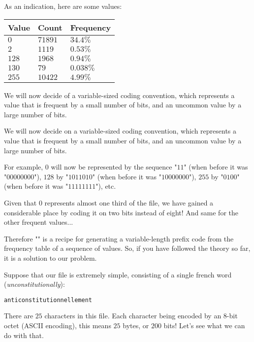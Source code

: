 	As an indication, here are some values:
	\begin{table}[H]
		\centering
		\begin{tabular}{|l|l|l|}
		\hline
		\rowcolor[HTML]{9B9B9B} 
		\textbf{Value} & \textbf{Count} & \textbf{Frequency} \\ \hline
		$0$ & $71891$ & $34.4\%$ \\ \hline
		$2$ & $1119$ & $0.53\%$ \\ \hline
		$128$ & $1968$ & $0.94\%$ \\ \hline
		$130$ & $79$ & $0.038\%$ \\ \hline
		$255$ & $10422$ & $4.99\%$ \\ \hline
		\end{tabular}
	\end{table}
	We will now decide of a variable-sized coding convention, which represents a value that is frequent by a small number of bits, and an uncommon value by a large number of bits.
	
	We will now decide on a variable-sized coding convention, which represents a value that is frequent by a small number of bits, and an uncommon value by a large number of bits.

	For example, $0$ will now be represented by the sequence "$11$" (when before it was "$00000000$"), $128$ by "$1011010$" (when before it was "$10000000$"), $255$ by "$0100$" (when before it was "$11111111$"), etc.

	Given that $0$ represents almost one third of the file, we have gained a considerable place by coding it on two bits instead of eight! And same for the other frequent values...

	Therefore "" is a recipe for generating a variable-length prefix code from the frequency table of a sequence of values. So, if you have followed the theory so far, it is a solution to our problem.

	Suppose that our file is extremely simple, consisting of a single french word (\textit{unconstitutionally}):
	\begin{center}
		\texttt{anticonstitutionnellement}
	\end{center}
	There are $25$ characters in this file. Each character being encoded by an $8$-bit octet (ASCII encoding), this means $25$ bytes, or $200$ bits! Let's see what we can do with that.

